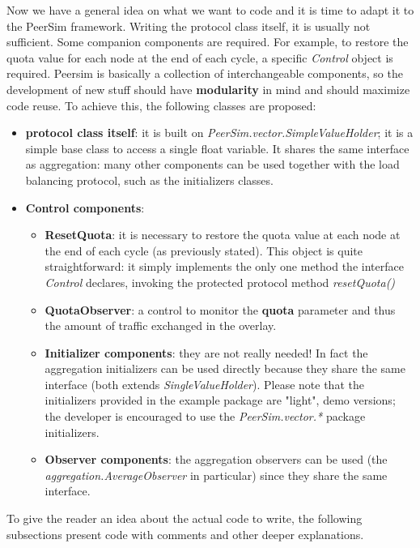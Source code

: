 \documentclass[a4paper,11pt]{article}
\begin{document}
Now we have a general idea on what we want to code and it is time to
adapt it to the PeerSim framework. Writing the protocol class itself,
it is usually not sufficient. Some companion components are required.
For example, to restore the quota value for each node at the end of
each cycle, a specific \emph{Control} object is required. Peersim
is basically a collection of interchangeable components, so the development
of new stuff should have \textbf{modularity} in mind and should maximize
code reuse. To achieve this, the following classes are proposed:

\begin{itemize}
\item \textbf{protocol class itself}: it is built on
  \emph{PeerSim.vector.SimpleValueHolder}; it is a simple base class
  to access a single float variable. It shares the same interface as
  aggregation: many other components can be used together with the
  load balancing protocol, such as the initializers classes. 

\item \textbf{Control components}: 

\begin{itemize}

\item \textbf{ResetQuota}: it is necessary to restore the quota value
  at each node at the end of each cycle (as previously stated). This
  object is quite straightforward: it simply implements the only one
  method the interface \emph{Control} declares, invoking the protected
  protocol method \emph{resetQuota()}

\item \textbf{QuotaObserver}: a control to monitor the \textbf{quota}
  parameter and thus the amount of traffic exchanged in the overlay. 

\item \textbf{Initializer components}: they are not really needed!
 In fact the aggregation initializers can be used directly because they
 share the same interface (both extends \emph{SingleValueHolder}).
Please note that the initializers provided in the example package are
"light", demo versions; the developer is encouraged to use the
\emph{PeerSim.vector.*} package initializers. 

\item \textbf{Observer components}: the aggregation observers can be
  used (the \emph{aggregation.AverageObserver} in particular) since
  they share the same interface.

\end{itemize}

\end{itemize}
To give the reader an idea about the actual code to write, the following
subsections present code with comments and other deeper explanations.
\end{document}

